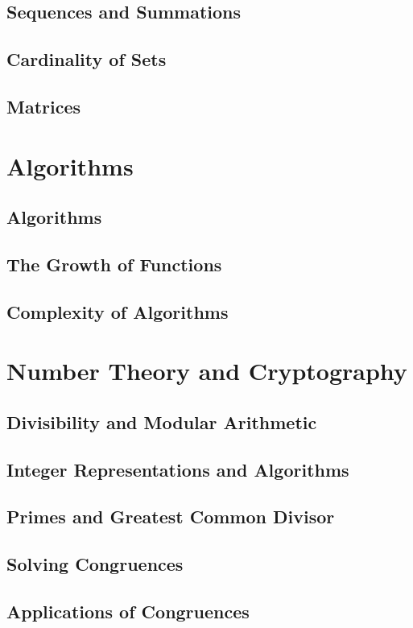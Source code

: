\documentclass[12pt]{article}
\begin{document}
    \subsection{Sequences and Summations}
    \subsection{Cardinality of Sets}
    \subsection{Matrices}

    \section{Algorithms}
    \subsection{Algorithms}
    \subsection{The Growth of Functions}
    \subsection{Complexity of Algorithms}

    \section{Number Theory and Cryptography}
    \subsection{Divisibility and Modular Arithmetic}
    \subsection{Integer Representations and Algorithms}
    \subsection{Primes and Greatest Common Divisor}
    \subsection{Solving Congruences}
    \subsection{Applications of Congruences}
\end{document}
